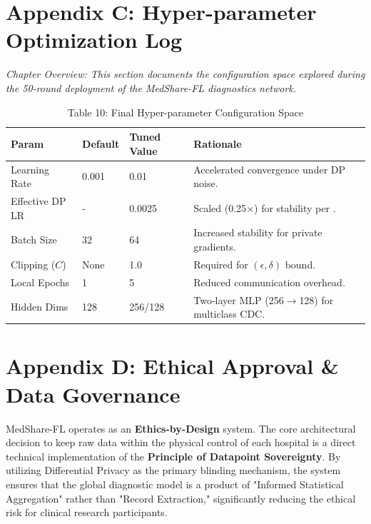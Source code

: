 \documentclass[10pt, a4paper, twocolumn]{article}
\begin{document}
\section*{Appendix C: Hyper-parameter Optimization Log}

\textit{Chapter Overview: This section documents the configuration space explored during the 50-round deployment of the MedShare-FL diagnostics network.}

\begin{table}[hbt!]
\centering
\scriptsize
\begin{tabular}{lp{1.5cm}p{1.5cm}p{2.5cm}}
\toprule
\textbf{Param} & \textbf{Default} & \textbf{Tuned Value} & \textbf{Rationale} \\
\midrule
Learning Rate & 0.001 & 0.01 & Accelerated convergence under DP noise. \\
Effective DP LR & - & 0.0025 & Scaled (0.25$\times$) for stability per \cite{abadi2016}. \\
Batch Size & 32 & 64 & Increased stability for private gradients. \\
Clipping ($C$) & None & 1.0 & Required for $(\epsilon, \delta)$ bound. \\
Local Epochs & 1 & 5 & Reduced communication overhead. \\
Hidden Dims & 128 & 256/128 & Two-layer MLP (256$\to$128) for multiclass CDC. \\
\bottomrule
\end{tabular}
\caption{Table 10: Final Hyper-parameter Configuration Space}
\end{table}

\section*{Appendix D: Ethical Approval \& Data Governance}
MedShare-FL operates as an \textbf{Ethics-by-Design} system. The core architectural decision to keep raw data within the physical control of each hospital is a direct technical implementation of the \textbf{Principle of Datapoint Sovereignty}. By utilizing Differential Privacy as the primary blinding mechanism, the system ensures that the global diagnostic model is a product of "Informed Statistical Aggregation" rather than "Record Extraction," significantly reducing the ethical risk for clinical research participants.
\end{document}
